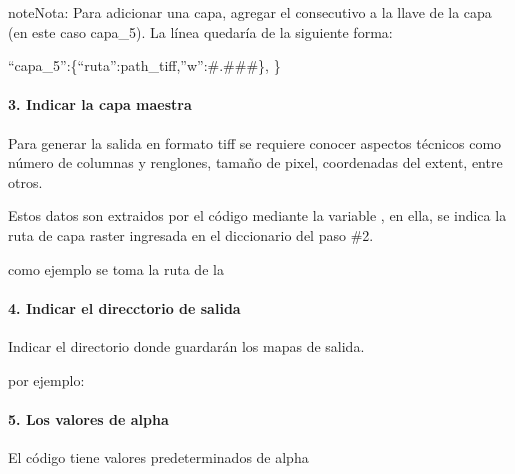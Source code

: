 \documentclass[letterpaper,10pt,spanish]{sphinxmanual}
\begin{document}
\begin{sphinxadmonition}{note}{Nota:}
Para adicionar una capa, agregar el consecutivo
a la llave de la capa (en este caso capa\_5).
La línea quedaría de la siguiente forma:

“capa\_5”:\{“ruta”:path\_tiff,”w”:\#.\#\#\#\},
\}
\end{sphinxadmonition}


\paragraph{3. Indicar la capa maestra}
\label{\detokenize{owa:indicar-la-capa-maestra}}
Para generar la salida en formato tiff se requiere conocer aspectos
técnicos como número de columnas y renglones, tamaño de pixel, coordenadas
del extent, entre otros.

Estos datos son extraidos por el código mediante la variable ,
en ella, se indica la ruta de  capa raster ingresada en el diccionario del
paso \#2.

como ejemplo se toma la ruta de la 

\begin{sphinxVerbatim}[commandchars=\\\{\}]
  
\end{sphinxVerbatim}


\paragraph{4. Indicar el direcctorio de salida}
\label{\detokenize{owa:indicar-el-direcctorio-de-salida}}
Indicar el directorio donde guardarán los mapas de salida.

por ejemplo:

\begin{sphinxVerbatim}[commandchars=\\\{\}]
  
\end{sphinxVerbatim}


\paragraph{5. Los valores de alpha}
\label{\detokenize{owa:los-valores-de-alpha}}
El código tiene valores  predeterminados de alpha
\end{document}
